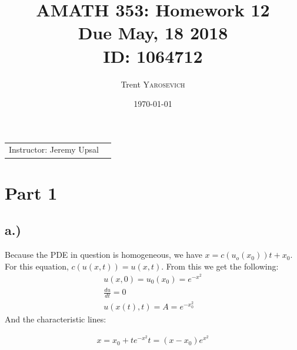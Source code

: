 \documentclass{article}
\title{AMATH 353: Homework 12 \\Due May, 18 2018 \\ ID: 1064712} %
\author{Trent \textsc{Yarosevich}} %
\date{\today} %
\begin{document}
\maketitle %
\setlength\parindent{1cm}

\begin{center}
\begin{tabular}{l r}
Instructor: Jeremy Upsal %
\end{tabular}
\end{center}


\section*{Part 1}
\subsection*{a.)}
Because the PDE in question is homogeneous, we have $x = c(u_o(x_0))t + x_0$. For this equation, $c(u(x,t)) = u(x, t)$. From this we get the following:
\begin{equation}
\begin{aligned}
u(x,0) = u_0(x_0) = e^{-x^2}\\
\frac{du}{dt} = 0\\
u(x(t), t) = A = e^{-x_0^2}
\end{aligned}
\end{equation}
And the characteristic lines:
\begin{tcolorbox}[minipage,colback=white,arc=0pt,outer arc=0pt]
\begin{equation}
\begin{aligned}
x = x_0 + te^{-x^2}
t = (x - x_0)e^{x^2}
\end{aligned}
\end{equation}
\end{tcolorbox}
\end{document}
